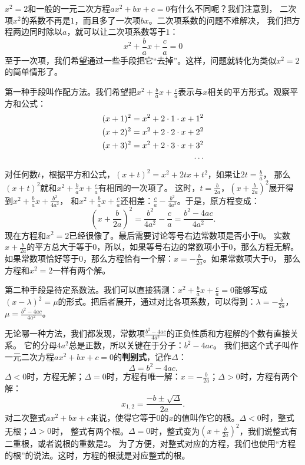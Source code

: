 \documentclass[12pt,UTF8]{ctexbook}
\begin{document}
$x^2 = 2$和一般的一元二次方程$ax^2 + bx + c = 0$有什么不同呢？我们注意到，
二次项$x^2$的系数不再是$1$，而且多了一次项$bx$。二次项系数的问题不难解决，
我们把方程两边同时除以$a$，就可以让二次项系数等于$1$：
$$ x^2 + \frac{b}{a} x + \frac{c}{a} = 0$$
至于一次项，我们希望通过一些手段把它“去掉”。这样，问题就转化为类似$x^2 = 2$的简单情形了。

第一种手段叫作配方法。我们希望把$x^2 + \frac{b}{a}x + \frac{c}{a}$表示与$x$相关的平方形式。观察平方和公式：
\begin{align}
    (x + 1)^2 = x^2 + 2\cdot 1\cdot x + 1^2 \notag \\
    (x + 2)^2 = x^2 + 2\cdot 2\cdot x + 2^2 \notag \\
    (x + 3)^2 = x^2 + 2\cdot 3\cdot x + 3^2 \notag \\
    \cdots \notag
\end{align}
对任何数$t$，根据平方和公式，$(x + t)^2 = x^2 + 2tx + t^2$，如果让$2t = \frac{b}{a}$，
那么$(x + t)^2$就和$x^2 + \frac{b}{a}x + \frac{c}{a}$有相同的一次项了。
这时，$t = \frac{b}{2a}$，$(x + \frac{b}{2a})^2$展开得到$x^2 + \frac{b}{a}x + \frac{b^2}{4a^2} $，
和$x^2 + \frac{b}{a}x + \frac{c}{a}$还相差：$\frac{c}{a} - \frac{b^2}{4a^2}$。于是，原方程变成：
$$ (x + \frac{b}{2a})^2 = \frac{b^2}{4a^2} - \frac{c}{a} = \frac{b^2 - 4ac}{4a^2}.$$
现在方程和$x^2 = 2$已经很像了。最后需要讨论等号右边常数项是否小于$0$。
实数$x + \frac{b}{2a}$的平方总大于等于$0$，所以，如果等号右边的常数项小于$0$，那么方程无解。
如果常数项恰好等于$0$，那么方程恰有一个解：$x = -\frac{b}{2a}$。如果常数项大于$0$，
那么方程和$x^2 = 2$一样有两个解。

第二种手段是待定系数法。我们可以直接猜测：$x^2 + \frac{b}{a} x + \frac{c}{a} = 0$能够写成
$(x - \lambda)^2 = \mu$的形式。把后者展开，通过对比各项系数，可以得到：$\lambda = -\frac{b}{2a}$，
$\mu = \frac{b^2 - 4ac}{4a^2}$。

无论哪一种方法，我们都发现，常数项$\frac{b^2 - 4ac}{4a^2}$的正负性质和方程解的个数有直接关系。
它的分母$4a^2$总是正数，所以关键在于分子：$b^2 - 4ac$。
我们把这个式子叫作一元二次方程$ax^2 + bx + c = 0$的\textbf{判别式}，记作$\Delta$：
$$\Delta = b^2 - 4ac.$$
$\Delta<0$时，方程无解；$\Delta = 0$时，方程有唯一解：$x = -\frac{b}{2a}$；$\Delta>0$时，方程有两个解：
$$x_{1,2} = \frac{-b \pm \sqrt{\Delta}}{2a}.$$
对二次整式$ax^2 + bx + c$来说，使得它等于$0$的$x$的值叫作它的根。$\Delta<0$时，整式无根；$\Delta>0$时，
整式有两个根。$\Delta = 0$时，整式变为$(x + \frac{b}{2a})^2$，我们说整式有二重根，或者说根的重数是$2$。
为了方便，对整式对应的方程，我们也使用“方程的根”的说法。这时，方程的根就是对应整式的根。
\end{document}
